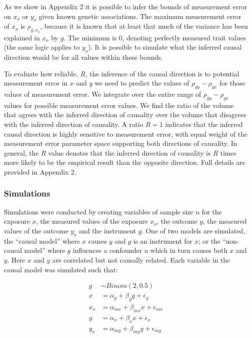 \documentclass[]{article}
\begin{document}
As we show in Appendix 2 it is possible to infer the bounds of
measurement error on \(x_o\) or \(y_o\) given known genetic
associations. The maximum measurement error of \(x_o\) is
\(\rho_{g,x_o}\), because it is known that at least that much of the
variance has been explained in \(x_o\) by \(g\). The minimum is 0,
denoting perfectly measured trait values (the same logic applies to
\(y_o\)). It is possible to simulate what the inferred causal direction
would be for all values within these bounds.

To evaluate how reliable, \(R\), the inference of the causal direction
is to potential measurement error in \(x\) and \(y\) we need to predict
the values of \(\rho_{gy} - \rho_{gx}\) for those values of measurement
error. We integrate over the entire range of \(\rho_{gy} - \rho_{gx}\)
values for possible measurement error values. We find the ratio of the
volume that agrees with the inferred direction of causality over the
volume that disagrees with the inferred direction of causality. A ratio
\(R=1\) indicates that the inferred causal direction is highly sensitive
to measurement error, with equal weight of the measurement error
parameter space supporting both directions of causality. In general, the
\(R\) value denotes that the inferred direction of causality is \(R\)
times more likely to be the empirical result than the opposite
direction. Full details are provided in Appendix 2.

\subsubsection{Simulations}\label{simulations}

Simulations were conducted by creating variables of sample size \(n\)
for the exposure \(x\), the measured values of the exposure \(x_o\), the
outcome \(y\), the measured values of the outcome \(y_o\) and the
instrument \(g\). One of two models are simulated, the ``causal model''
where \(x\) causes \(y\) and \(g\) is an instrument for \(x\); or the
``non-causal model'' where \(g\) influences a confounder \(u\) which in
turn causes both \(x\) and \(y\). Here \(x\) and \(y\) are correlated
but not causally related. Each variable in the causal model was
simulated such that:

\[
\begin{aligned}
g & \sim Binom(2, 0.5) \\
x & = \alpha_g + \beta_g g + \epsilon_g \\
x_o & = \alpha_{mx} + \beta_{mx} x + \epsilon_{mx} \\
y & = \alpha_x + \beta_x x + \epsilon_x \\
y_o & = \alpha_{my} + \beta_{my} y + \epsilon_{my} \\
\end{aligned}
\]
\end{document}
